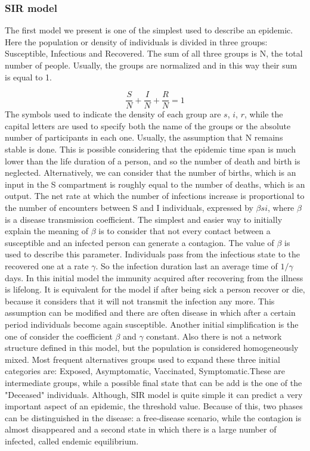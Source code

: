 \subsubsection{SIR model}
\label{subsec:SIR}
The first model we present is one of the simplest used to describe an epidemic. Here the population or density of individuals is divided in three groups: Susceptible, Infectious and Recovered. 
The sum of all three groups is N, the total number of people. Usually, the groups are normalized and in this way their sum is equal to 1. 

\begin{equation}
	\frac{S}{N} + \frac{I}{N} + \frac{R}{N} = 1 
\end{equation}
The symbols used to indicate the density of each group are $s$, $i$, $r$, while the capital letters are used to specify both the name of the groups or the absolute number of participants in each one. 
Usually, the assumption that N remains stable is done. This is possible considering that the epidemic time span is much lower than the life duration of a person, and so the number of death and birth is neglected. Alternatively, we can consider that the number of births, which is an input in the S compartment is roughly equal to the number of deaths, which is an output. 
The net rate at which the number of infections increase is proportional to the number of encounters between S and I individuals, expressed by $ \beta s i $, where $\beta$ is a disease transmission coefficient. The simplest and easier way to initially explain the meaning of $\beta$ is to consider that not every contact between a susceptible and an infected person can generate a contagion. The value of $\beta$ is used to describe this parameter. 
Individuals pass from the infectious state to the recovered one at a rate $\gamma$. So the infection duration last an average time of $1/\gamma$ days. 
 In this initial model the immunity acquired after recovering from the illness is lifelong. It is equivalent for the model if after being sick a person recover or die, because it considers that it will not transmit the infection any more.  This assumption can be modified and there are often disease in which after a certain period individuals become again susceptible. Another initial simplification is the one of consider the coefficient $\beta$ and $\gamma$ constant. Also there is not a network structure defined in this model, but the population is considered homogeneously mixed. 
Most frequent alternatives groups used to expand these three initial categories are: Exposed, Asymptomatic, Vaccinated, Symptomatic.These are intermediate groups, while a possible final state that can be add is the one of the "Deceased" individuals.   
Although, SIR model is quite simple it can predict a very important aspect of an epidemic, the threshold value. Because of this, two phases can be distinguished in the disease: a free-disease scenario, while the contagion is almost disappeared and a second state in which there is a large number of infected, called endemic equilibrium.

